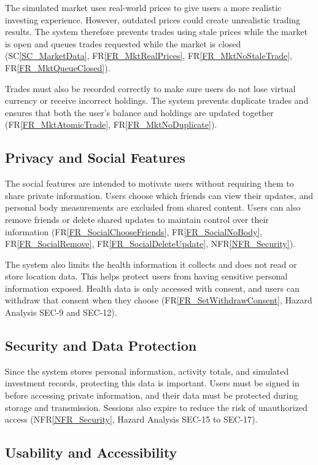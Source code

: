 \documentclass[12pt]{article}
\newcommand{\rref}[1]{FR\ref{#1}}
\newcommand{\nfrref}[1]{NFR\ref{#1}}
\newcommand{\scref}[1]{SC\ref{#1}}
\begin{document}
The simulated market uses real-world prices to give users
a more realistic investing experience. However, outdated
prices could create unrealistic trading results. The system
therefore prevents trades using stale prices while the market
is open and queues trades requested while the market is
closed (\scref{SC_MarketData},
\rref{FR_MktRealPrices},
\rref{FR_MktNoStaleTrade},
\rref{FR_MktQueueClosed}).

Trades must also be recorded correctly to make sure users
do not lose virtual currency or receive incorrect holdings.
The system prevents duplicate trades and ensures that both
the user's balance and holdings are updated together
(\rref{FR_MktAtomicTrade},
\rref{FR_MktNoDuplicate}).

\subsection{Privacy and Social Features}

The social features are intended to motivate users without
requiring them to share private information. Users choose
which friends can view their updates, and personal body
measurements are excluded from shared content. Users can
also remove friends or delete shared updates to maintain
control over their information
(\rref{FR_SocialChooseFriends},
\rref{FR_SocialNoBody},
\rref{FR_SocialRemove},
\rref{FR_SocialDeleteUpdate},
\nfrref{NFR_Security}).

The system also limits the health information it collects
and does not read or store location data. This helps protect
users from having sensitive personal information exposed.
Health data is only accessed with consent, and users can
withdraw that consent when they choose (\rref{FR_SetWithdrawConsent},
Hazard Analysis SEC-9 and SEC-12).


\subsection{Security and Data Protection}

Since the system stores personal information, activity totals,
and simulated investment records, protecting this data is
important. Users must be signed in before accessing private
information, and their data must be protected during storage
and transmission. Sessions also expire to reduce the risk of
unauthorized access (\nfrref{NFR_Security}, Hazard Analysis SEC-15 to
SEC-17).

\subsection{Usability and Accessibility}
\end{document}
